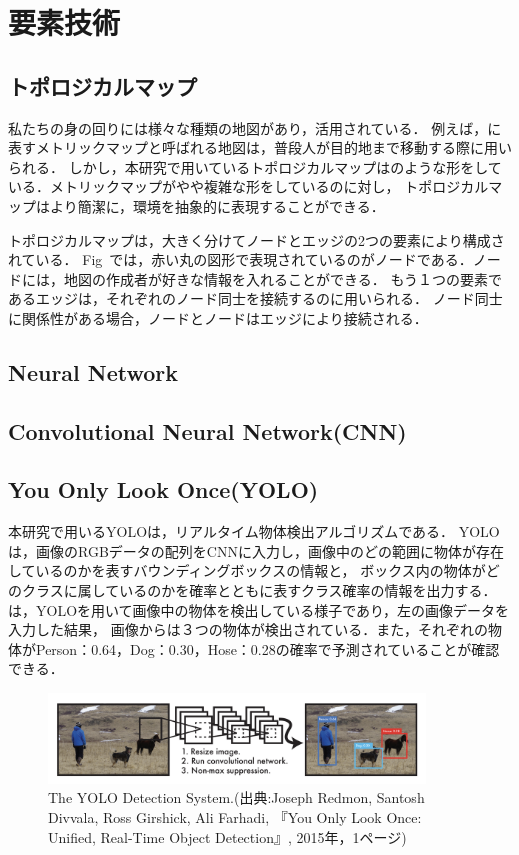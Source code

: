 \documentclass[../main]{subfiles}
\begin{document}
\setcounter{secnumdepth}{4}
    \chapter{要素技術}
        \section{トポロジカルマップ}
        私たちの身の回りには様々な種類の地図があり，活用されている．
        例えば，に表すメトリックマップと呼ばれる地図は，普段人が目的地まで移動する際に用いられる．
        しかし，本研究で用いているトポロジカルマップはのような形をしている．メトリックマップがやや複雑な形をしているのに対し，
        トポロジカルマップはより簡潔に，環境を抽象的に表現することができる．

        
        トポロジカルマップは，大きく分けてノードとエッジの2つの要素により構成されている．
        Fig~では，赤い丸の図形で表現されているのがノードである．ノードには，地図の作成者が好きな情報を入れることができる．
        もう１つの要素であるエッジは，それぞれのノード同士を接続するのに用いられる．
        ノード同士に関係性がある場合，ノードとノードはエッジにより接続される．
    
        \section{Neural Network}
        \section{Convolutional Neural Network(CNN)}
        \section{You Only Look Once(YOLO)}
        本研究で用いるYOLO\cite{yolo_paper}は，リアルタイム物体検出アルゴリズムである．
        YOLOは，画像のRGBデータの配列をCNNに入力し，画像中のどの範囲に物体が存在しているのかを表すバウンディングボックスの情報と，
        ボックス内の物体がどのクラスに属しているのかを確率とともに表すクラス確率の情報を出力する．
        は，YOLOを用いて画像中の物体を検出している様子であり，左の画像データを入力した結果，
        画像からは３つの物体が検出されている．また，それぞれの物体がPerson：0.64，Dog：0.30，Hose：0.28の確率で予測されていることが確認できる． 

        \begin{figure}[H]
        \centering
        \includegraphics[width=10cm]{yolo_exp.png}
        \caption{The YOLO Detection System.(出典:Joseph Redmon, Santosh Divvala, Ross Girshick, Ali Farhadi, 『You Only Look Once: Unified, Real-Time Object Detection』, 2015年，1ページ)}
        \label{figure::yolo_exp}
        \end{figure}
    
\end{document}
